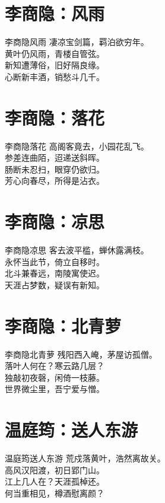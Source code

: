\documentclass[12pt,oneside,a5paper]{book}
\begin{document}
\chapter{李商隐：风雨}
\begin{poemzh}{李商隐}{风雨}
凄凉宝剑篇，羁泊欲穷年。\\
黄叶仍风雨，青楼自管弦。\\
新知遭薄俗，旧好隔良缘。\\
心断新丰酒，销愁斗几千。\\ 
\end{poemzh}

\chapter{李商隐：落花}
\begin{poemzh}{李商隐}{落花}
高阁客竟去，小园花乱飞。\\
参差连曲陌，迢递送斜晖。\\
肠断未忍扫，眼穿仍欲归。\\
芳心向春尽，所得是沾衣。\\ 
\end{poemzh}

\chapter{李商隐：凉思}
\begin{poemzh}{李商隐}{凉思}
客去波平槛，蝉休露满枝。\\
永怀当此节，倚立自移时。\\
北斗兼春远，南陵寓使迟。\\
天涯占梦数，疑误有新知。\\ 
\end{poemzh}

\chapter{李商隐：北青萝}
\begin{poemzh}{李商隐}{北青萝}
残阳西入崦，茅屋访孤僧。\\
落叶人何在？寒云路几层？\\
独敲初夜磬，闲倚一枝藤。\\
世界微尘里，吾宁爱与憎。\\ 
\end{poemzh}

\chapter{温庭筠：送人东游}
\begin{poemzh}{温庭筠}{送人东游}
荒戍落黄叶，浩然离故关。\\
高风汉阳渡，初日郢门山。\\
江上几人在？天涯孤棹还。\\
何当重相见，樽酒慰离颜？\\ 
\end{poemzh}
\end{document}

